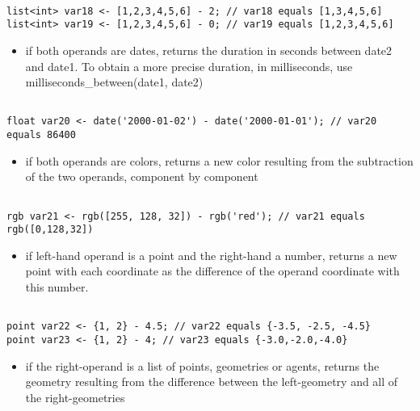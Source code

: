 \documentclass[]{book}
\providecommand{\tightlist}{%
  \setlength{\itemsep}{0pt}\setlength{\parskip}{0pt}}
\theoremstyle{definition}
\theoremstyle{definition}
\theoremstyle{definition}
\theoremstyle{remark}
\begin{document}
\begin{verbatim}
 
list<int> var18 <- [1,2,3,4,5,6] - 2; // var18 equals [1,3,4,5,6] 
list<int> var19 <- [1,2,3,4,5,6] - 0; // var19 equals [1,2,3,4,5,6]
\end{verbatim}

\begin{itemize}
\tightlist
\item
  if both operands are dates, returns the duration in seconds between
  date2 and date1. To obtain a more precise duration, in milliseconds,
  use milliseconds\_between(date1, date2)
\end{itemize}

\begin{verbatim}
 
float var20 <- date('2000-01-02') - date('2000-01-01'); // var20 equals 86400
\end{verbatim}

\begin{itemize}
\tightlist
\item
  if both operands are colors, returns a new color resulting from the
  subtraction of the two operands, component by component
\end{itemize}

\begin{verbatim}
 
rgb var21 <- rgb([255, 128, 32]) - rgb('red'); // var21 equals rgb([0,128,32])
\end{verbatim}

\begin{itemize}
\tightlist
\item
  if left-hand operand is a point and the right-hand a number, returns a
  new point with each coordinate as the difference of the operand
  coordinate with this number.
\end{itemize}

\begin{verbatim}
 
point var22 <- {1, 2} - 4.5; // var22 equals {-3.5, -2.5, -4.5} 
point var23 <- {1, 2} - 4; // var23 equals {-3.0,-2.0,-4.0}
\end{verbatim}

\begin{itemize}
\tightlist
\item
  if the right-operand is a list of points, geometries or agents,
  returns the geometry resulting from the difference between the
  left-geometry and all of the right-geometries
\end{itemize}
\end{document}
